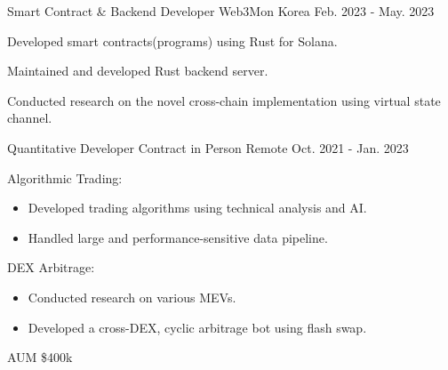 \begin{cventries}

\cventry
{Smart Contract \& Backend Developer} %
{Web3Mon} %
{Korea} %
{Feb. 2023 - May. 2023} %
{ %
\begin{cvitems}
\item {Developed smart contracts(programs) using Rust for Solana.}
\item {Maintained and developed Rust backend server.}
\item {Conducted research on the novel cross-chain implementation using virtual state channel.}
\end{cvitems}
}


\cventry
{Quantitative Developer} %
{Contract in Person} %
{Remote} %
{Oct. 2021 - Jan. 2023} %
{ %
\begin{cvitems}
\item {Algorithmic Trading:}
\begin{itemize}
  \item {Developed trading algorithms using technical analysis and AI.}
  \item {Handled large and performance-sensitive data pipeline.}
\end{itemize}
\item {DEX Arbitrage:}
\begin{itemize}
  \item {Conducted research on various MEVs.}
  \item {Developed a cross-DEX, cyclic arbitrage bot using flash swap.}
\end{itemize}
\item {AUM \$400k}
\end{cvitems}
}


\end{cventries}

